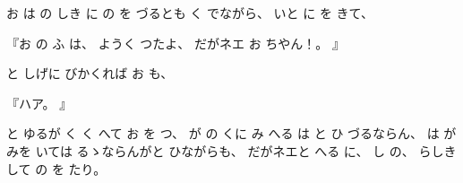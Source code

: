 
%
お
は
の
しき
に
の
を
づるとも
く
でながら、
%
いと
に
を
きて、

%
『お
の
ふ
は、
%
ようく
つたよ、
%
だがネエ
お
ちやん！。
』

%
と
しげに
びかくれば
お
も、

%
『ハア。
』

%
と
ゆるが
く
く
へて
お
を
つ、
%
が
の
くに
み
へる
は
と
ひ
づるならん、
%
は
が
みを
いては
るゝならんがと
ひながらも、
%
だがネエと
へる
に、
%
し
の、
%
らしき
して
の
を
たり。

